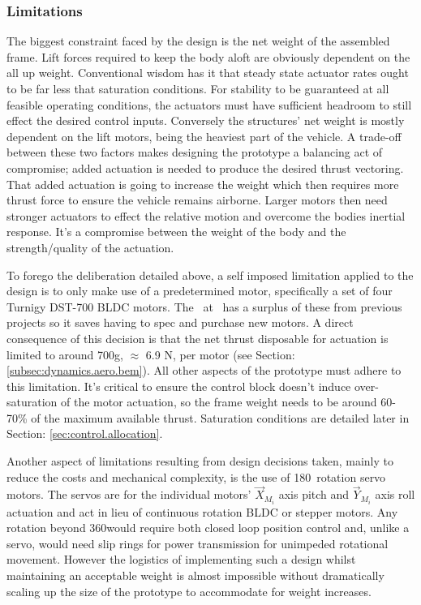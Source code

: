 \subsubsection{Limitations}
\label{subsubsec:intro.foreword.limits}
The biggest constraint faced by the design is the net weight of the assembled frame. Lift forces required to keep the body aloft are obviously dependent on the all up weight. Conventional wisdom has it that steady state actuator rates ought to be far less that saturation conditions. For stability to be guaranteed at all feasible operating conditions, the actuators must have sufficient headroom to still effect the desired control inputs. Conversely the structures' net weight is mostly dependent on the lift motors, being the heaviest part of the vehicle. A trade-off between these two factors makes designing the prototype a balancing act of compromise; added actuation is needed to produce the desired thrust vectoring. That added actuation is going to increase the weight which then requires more thrust force to ensure the vehicle remains airborne. Larger motors then need stronger actuators to effect the relative motion and overcome the bodies inertial response. It's a compromise between the weight of the body and the strength/quality of the actuation.
\par
To forego the deliberation detailed above, a self imposed limitation applied to the design is to only make use of a predetermined motor, specifically a set of four Turnigy DST-700 BLDC motors. The \dept ~at \uni ~has a surplus of these from previous projects so it saves having to spec and purchase new motors. A direct consequence of this decision is that the net thrust disposable for actuation is limited to around 700g, $\approx$ 6.9 N, per motor (see Section: \ref{subsec:dynamics.aero.bem}). All other aspects of the prototype must adhere to this limitation. It's critical to ensure the control block doesn't induce over-saturation of the motor actuation, so the frame weight needs to be around 60-70\% of the maximum available thrust. Saturation conditions are detailed later in Section: \ref{sec:control.allocation}.
\par
Another aspect of limitations resulting from design decisions taken, mainly to reduce the costs and mechanical complexity, is the use of 180\textdegree ~rotation servo motors. The servos are for the individual motors' $\vec{X}_{M_i}$ axis pitch and $\vec{Y}_{M_i}$ axis roll actuation and act in lieu of continuous rotation BLDC or stepper motors. Any rotation beyond 360\textdegree would require both closed loop position control and, unlike a servo, would need slip rings for power transmission for unimpeded rotational movement. However the logistics of implementing such a design whilst maintaining an acceptable weight is almost impossible without dramatically scaling up the size of the prototype to accommodate for weight increases.
